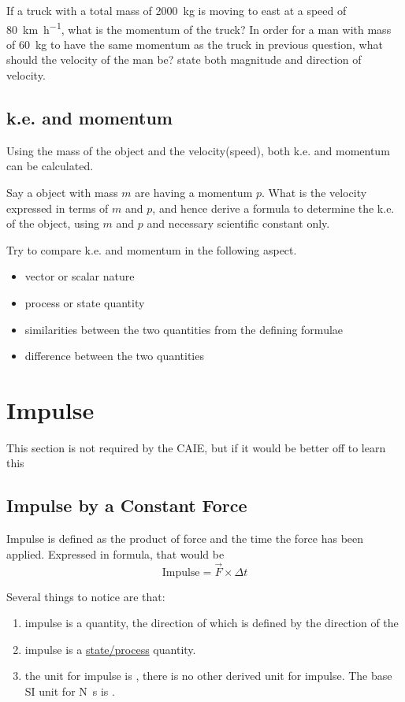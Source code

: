\documentclass[a4paper]{tufte-handout}
\newenvironment{TaskBox} %
{\begin{tcolorbox}[breakable,colback=b1!30,colframe=b1,title=Task]} {\end{tcolorbox}}
\newenvironment{ExampleBox} %
{\begin{tcolorbox}[breakable,colback=g1!30,colframe=g1,title=Example]} {\end{tcolorbox}}
\newenvironment{SummBox}
{\begin{tcolorbox}[breakable,colback=r1!30,colframe=r1,title=Summary]} {\end{tcolorbox}}
\begin{document}
\begin{TaskBox}
If a truck with a  total mass of \SI{2000}{\kg} is moving to east at a speed of \SI{80}{\kilo\metre\per\hour}, what is the momentum of the truck?
\tcblower
In order for a man with mass of \SI{60}{\kg} to have the same momentum as the truck in previous question, what should the velocity of the man be? state both magnitude and direction of velocity.
\vspace{3 in}
\end{TaskBox}

\subsection{k.e. and momentum}
Using the mass of the object and the velocity(speed), both k.e. and momentum can be calculated. 
\begin{ExampleBox}
Say a object with mass $m$ are having a momentum $p$. What is the velocity expressed in terms of $m$ and $p$, and hence derive a formula to determine the k.e. of the object, using $m$ and $p$ and necessary scientific constant only. 
\vspace{2 in}
\end{ExampleBox}
Try to compare k.e. and momentum in the following aspect.
\begin{itemize}
  \item vector or scalar nature
  \item process or state quantity
  \item similarities between the two quantities from the defining formulae
  \item difference between the two quantities
\end{itemize}

\section{Impulse}
This section is not required by the CAIE, but if it would be better off to learn this
\subsection{Impulse by a Constant Force}
\begin{SummBox}
Impulse is defined as the product of force and the time the force has been applied. Expressed in formula, that would be 
\[
   \text{Impulse} = \vec{F}\times \Delta t
\]
\end{SummBox}
Several things to notice are that:
\begin{enumerate}
  \item impulse is a \uline{\hspace{1 in}} quantity, the direction of which is defined by the direction of the \uline{\hspace{1 in}}
  \item impulse is a \uline{state/process} quantity.
  \item the unit for impulse is \uline{\hspace{2 in}}, there is no other derived unit for impulse. The base SI unit for \si{\newton\second} is \uline{\hspace{1 in}}.
\end{enumerate}
\end{document}
